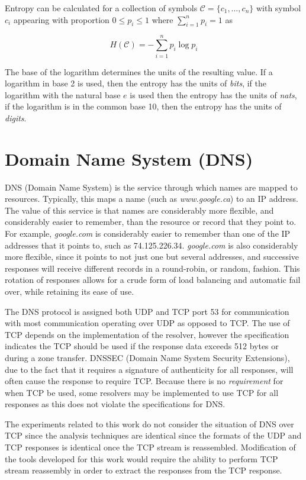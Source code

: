 \documentclass[12pt]{report}
\theoremstyle{remark}
\theoremstyle{definition}
\theoremstyle{definition}
\theoremstyle{definition}
\begin{document}
Entropy can be calculated for a collection of symbols
$\mathcal{C}=\{c_1,\ldots,c_n\}$ with symbol $c_i$ appearing with proportion
$0\leq p_i\leq 1$ where $\sum_{i=1}^n{p_i}=1$ as

 \[H(\mathcal{C})=-\sum_{i=1}^n{p_i \log{p_i}}\]

The base of the logarithm determines the units of the resulting value. If a
logarithm in base 2 is used, then the entropy has the units of \emph{bits}, if
the logarithm with the natural base $e$ is used then the entropy has the units
of \emph{nats}, if the logarithm is in the common base 10, then the entropy has
the units of \emph{digits}.

\section{Domain Name System (DNS)}

DNS (Domain Name System) is the service through which names are mapped to
resources. Typically, this maps a name (such as \emph{www.google.ca}) to an IP
address. The value of this service is that names are considerably more
flexible, and considerably easier to remember, than the resource or record that
they point to. For example, \emph{google.com} is considerably
easier to remember than one of the IP addresses that it points to, such as
74.125.226.34. \emph{google.com} is also considerably more flexible, since it
points to not just one but several addresses, and successive responses
will receive different records in a round-robin, or random, fashion. This
rotation of responses allows for a crude form of load balancing and automatic
fail over, while retaining its ease of use.

The DNS protocol is assigned both UDP and TCP port 53 for
communication with most communication operating over UDP as opposed to TCP. The
use of TCP depends on the implementation of the resolver, however the
specification indicates the TCP should be used if the response data exceeds 512
bytes or during a zone transfer\cite{rfc1035}. DNSSEC (Domain Name System
Security Extensions), due to the fact that it requires a signature of
authenticity for all responses, will often cause the response to
require TCP\cite{rfc4034}.
Because there is no \emph{requirement} for when
TCP be used, some resolvers may be implemented to use TCP for all responses as
this does not violate the specifications for DNS.

The experiments related to this work do not consider the situation of DNS over
TCP since the analysis techniques are identical since the formats of the UDP
and TCP responses is identical once the TCP stream is reassembled. Modification
of the tools developed for this work would require the ability to perform TCP
stream reassembly in order to extract the responses from the TCP response.
\end{document}
